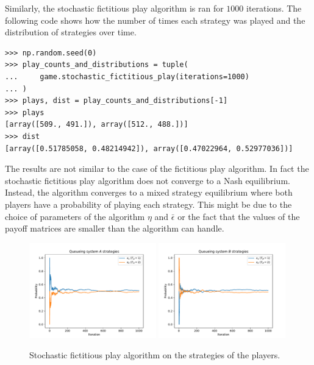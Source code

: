 Similarly, the stochastic fictitious play algorithm is ran for \(1000\)
iterations.
The following code shows how the number of times each strategy was played and
the distribution of strategies over time.

\begin{lstlisting}[style=pystyle]
>>> np.random.seed(0)
>>> play_counts_and_distributions = tuple(
...     game.stochastic_fictitious_play(iterations=1000)
... )
>>> plays, dist = play_counts_and_distributions[-1]
>>> plays
[array([509., 491.]), array([512., 488.])]
>>> dist
[array([0.51785058, 0.48214942]), array([0.47022964, 0.52977036])]

\end{lstlisting}

The results are not similar to the case of the fictitious play algorithm.
In fact the stochastic fictitious play algorithm does not converge to a Nash
equilibrium.
Instead, the algorithm converges to a mixed strategy equilibrium where both
players have a probability of playing each strategy.
This might be due to the choice of parameters of the algorithm \(\eta\) and
\(\bar{\epsilon}\) or the fact that the values of the payoff matrices are
smaller than the algorithm can handle.

\begin{figure}[H]
    \centering
    \includegraphics[width=0.49\textwidth]{chapters/04_game_theoretic_model/Bin/numeric_results/stochastic_fictitious_play_A.pdf}
    \includegraphics[width=0.49\textwidth]{chapters/04_game_theoretic_model/Bin/numeric_results/stochastic_fictitious_play_B.pdf}
    \caption{Stochastic fictitious play algorithm on the strategies of the
    players.}
    \label{fig:solving_game_stochastic_fictitious_example}
\end{figure}

